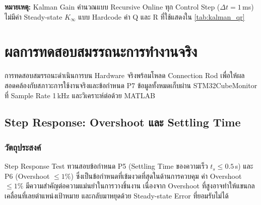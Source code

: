 \noindent\textbf{หมายเหตุ:}
Kalman Gain คำนวณแบบ Recursive Online ทุก Control Step ($\Delta t = 1$\,ms)
ไม่มีค่า Steady-state $K_\infty$ แบบ Hardcode
ค่า Q และ R ที่ใช้แสดงใน \cref{tab:kalman_qr}


\section{ผลการทดสอบสมรรถนะการทำงานจริง}
\label{sec:performance}

การทดสอบสมรรถนะดำเนินการบน Hardware จริงพร้อมโหลด Connection Rod
เพื่อให้ผลสอดคล้องกับสภาวะการใช้งานจริงและข้อกำหนด P7
ข้อมูลทั้งหมดเก็บผ่าน STM32CubeMonitor ที่ Sample Rate 1\,kHz
และวิเคราะห์ต่อด้วย MATLAB

\subsection{Step Response: Overshoot และ Settling Time}
\label{subsec:step_response}

\subsubsection{วัตถุประสงค์}

Step Response Test ทวนสอบข้อกำหนด P5 (Settling Time ของความเร็ว $t_s \leq 0.5$\,s)
และ P6 (Overshoot $\leq 1\%$) ซึ่งเป็นข้อกำหนดที่เข้มงวดที่สุดในด้านการควบคุม
ค่า Overshoot $\leq 1\%$ มีความสำคัญต่อความแม่นยำในการวางชิ้นงาน
เนื่องจาก Overshoot ที่สูงอาจทำให้แขนกลเคลื่อนที่เลยตำแหน่งเป้าหมาย
และกลับมาหยุดด้วย Steady-state Error ที่ยอมรับไม่ได้

